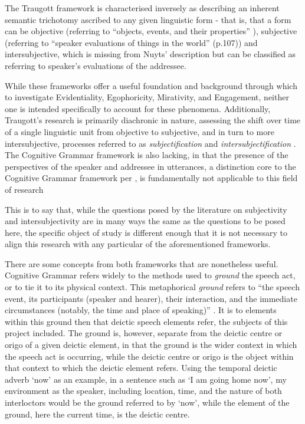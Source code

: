The Traugott framework is characterised inversely as describing an inherent semantic trichotomy ascribed to any given linguistic form - that is, that a form can be objective (referring to ``objects, events, and their properties'' \cite[107]{Nuyts2015}), subjective (referring to ``speaker evaluations of things in the world'' (p.107)) and intersubjective, which is missing from Nuyts' description but can be classified as referring to speaker's evaluations of the addressee.

While these frameworks offer a useful foundation and background through which to investigate Evidentiality, Egophoricity, Mirativity, and Engagement, neither one is intended specifically to account for these phenomena. Additionally, Traugott's research is primarily diachronic in nature, assessing the shift over time of a single linguistic unit from objective to subjective, and in turn to more intersubjective, processes referred to as \textit{subjectification} and \textit{intersubjectification} \cites{Traugott1995}{Traugott2014}. The Cognitive Grammar framework is also lacking, in that the presence of the perspectives of the speaker and addressee in utterances, a distinction core to the Cognitive Grammar framework per , is fundamentally not applicable to this field of research 

This is to say that, while the questions posed by the literature on subjectivity and intersubjectivity are in many ways the same as the questions to be posed here, the specific object of study is different enough that it is not necessary to align this research with any particular of the aforementioned frameworks.

There are some concepts from both frameworks that are nonetheless useful. Cognitive Grammar refers widely to the methods used to \textit{ground} the speech act, or to tie it to its physical context. This metaphorical \textit{ground} refers to ``the speech event, its participants (speaker and hearer), their interaction, and the immediate circumstances (notably, the time and place of speaking)'' \cite[259]{Langacker2008}. It is to elements within this ground then that deictic speech elements refer, the subjects of this project included. The ground is, however, separate from the deictic centre or origo of a given deictic element, in that the ground is the wider context in which the speech act is occurring, while the deictic centre or origo is the object within that context to which the deictic element refers. Using the temporal deictic adverb `now' as an example, in a sentence such as `I am going home now', my environment as the speaker, including location, time, and the nature of both interloctors would be the ground referred to by `now', while the element of the ground, here the current time, is the deictic centre.

